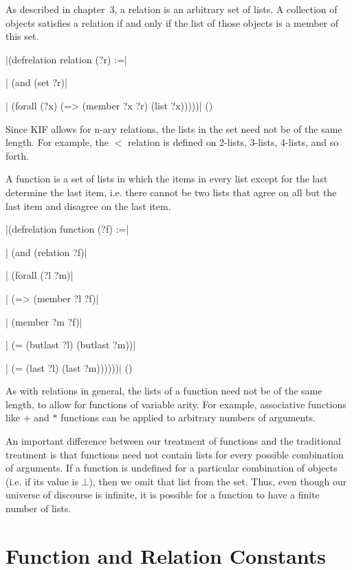 As described in chapter~3, a relation is an arbitrary set of lists.  A
collection of objects satisfies a relation if and only if the list of
those objects is a member of this set.

\medskip
\verbatim|(defrelation relation (?r) :=|\par
\verbatim|  (and (set ?r)|\par
\verbatim|       (forall (?x) (=> (member ?x ?r) (list ?x)))))|
\hfill(\equation)\par
\medskip

Since KIF allows for n-ary relations, the lists in the set need not
be of the same length.  For example, the $<$ relation is defined on
2-lists, 3-lists, 4-lists, and so forth.

A function is a set of lists in which the items in every list
except for the last determine the last item, i.e. there cannot be two
lists that agree on all but the last item and disagree on the last
item.  

\medskip
\verbatim|(defrelation function (?f) :=|\par
\verbatim|  (and (relation ?f)|\par
\verbatim|       (forall (?l ?m)|\par
\verbatim|         (=> (member ?l ?f)|\par
\verbatim|             (member ?m ?f)|\par
\verbatim|             (= (butlast ?l) (butlast ?m))|\par
\verbatim|             (= (last ?l) (last ?m))))))|
\hfill(\equation)\par
\medskip

As with relations in general, the lists of a function need
not be of the same length, to allow for functions of variable arity. 
For example, associative functions like $+$ and $*$ functions can be
applied to arbitrary numbers of arguments.

An important difference between our treatment of functions and the
traditional treatment is that functions need not contain lists for
every possible combination of arguments.  If a function is undefined for
a particular combination of objects (i.e. if its value is $\bot$), then
we omit that list from the set.  Thus, even though our universe of
discourse is infinite, it is possible for a function to have a finite
number of lists.

\section{Function and Relation Constants}


